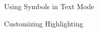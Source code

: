 \begin{sfragment}{Using \sTeX Symbols in Text Mode}

\end{sfragment}

\begin{sfragment}[id=sec.customhighlight]{Customizing Highlighting}

\end{sfragment}